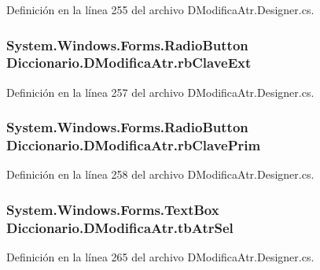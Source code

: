 Definición en la línea 255 del archivo D\-Modifica\-Atr.\-Designer.\-cs.

\hypertarget{class_diccionario_1_1_d_modifica_atr_aa0ab5953af16bf77bebfbedcb8d18edb}{
\subsubsection[{rb\-Clave\-Ext}]{\setlength{\rightskip}{0pt plus 5cm}System.\-Windows.\-Forms.\-Radio\-Button Diccionario.\-D\-Modifica\-Atr.\-rb\-Clave\-Ext}}\label{class_diccionario_1_1_d_modifica_atr_aa0ab5953af16bf77bebfbedcb8d18edb}


Definición en la línea 257 del archivo D\-Modifica\-Atr.\-Designer.\-cs.

\hypertarget{class_diccionario_1_1_d_modifica_atr_a0e0dbba9ca1f122d708f88303b28cb5b}{
\subsubsection[{rb\-Clave\-Prim}]{\setlength{\rightskip}{0pt plus 5cm}System.\-Windows.\-Forms.\-Radio\-Button Diccionario.\-D\-Modifica\-Atr.\-rb\-Clave\-Prim}}\label{class_diccionario_1_1_d_modifica_atr_a0e0dbba9ca1f122d708f88303b28cb5b}


Definición en la línea 258 del archivo D\-Modifica\-Atr.\-Designer.\-cs.

\hypertarget{class_diccionario_1_1_d_modifica_atr_a5ae23b45d7722ea5f3b719b9d73921d8}{
\subsubsection[{tb\-Atr\-Sel}]{\setlength{\rightskip}{0pt plus 5cm}System.\-Windows.\-Forms.\-Text\-Box Diccionario.\-D\-Modifica\-Atr.\-tb\-Atr\-Sel}}\label{class_diccionario_1_1_d_modifica_atr_a5ae23b45d7722ea5f3b719b9d73921d8}


Definición en la línea 265 del archivo D\-Modifica\-Atr.\-Designer.\-cs.

